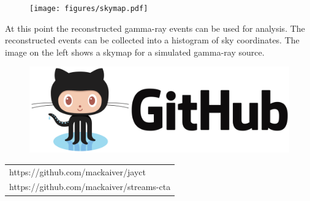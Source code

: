 \begin{multicols}{2}
\begin{center}
        \begin{streamblock}[equal height group=C, width=0.8\linewidth]{-5mm}{0}{}%
          \begin{multicols}{2}
            \begin{figure}
              \texttt{[image: figures/skymap.pdf]}
            \end{figure}
            \columnbreak
            At this point the reconstructed gamma-ray events can be used for analysis.
            The reconstructed events can be collected into a histogram of sky coordinates.
            The image on the left shows a skymap for a simulated gamma-ray source.
          \end{multicols}
        \end{streamblock}%
        \vspace{2cm}
        \begin{multicols}{2}
            \begin{figure}
              \includegraphics[width=\linewidth]{logos/github.png}
            \end{figure}
            \columnbreak
                \vspace*{2cm}
                \begin{tabular}{l}
                https://github.com/mackaiver/jayct \\
                https://github.com/mackaiver/streams-cta
                \end{tabular}




          \end{multicols}


      \end{center}

\end{multicols}


